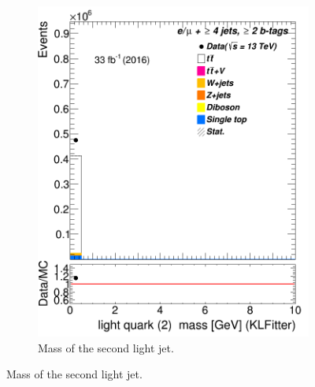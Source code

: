 \begin{figure}
\begin{subfigure}{0.35\textwidth}
		\includegraphics[width=\linewidth]{ControlPlots_emujets_2016_4incl_2incl/klf_lq2_m_emujets_2016.png}
		\caption{Mass of the second light jet.} \label{fig:klf13}
	\end{subfigure}
	
	
	

\end{figure}
